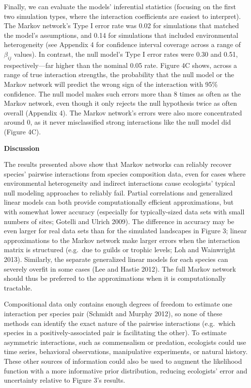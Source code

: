 \documentclass[12pt,]{article}
\begin{document}
\begin{spacing}{1.9}
\begin{flushleft}
Finally, we can evaluate the models' inferential statistics (focusing on
the first two simulation types, where the interaction coefficients are
easiest to interpret). The Markov network's Type I error rate was 0.02
for simulations that matched the model's assumptions, and 0.14 for
simulations that included environmental heterogeneity (see Appendix 4
for confidence interval coverage across a range of \(\beta_{ij}\)
values). In contrast, the null model's Type I error rates were 0.30 and
0.51, respectively---far higher than the nominal 0.05 rate. Figure 4C
shows, across a range of true interaction strengths, the probability
that the null model or the Markov network will predict the wrong sign of
the interaction with 95\% confidence. The null model makes such errors
more than 8 times as often as the Markov network, even though it only
rejects the null hypothesis twice as often overall (Appendix 4). The
Markov network's errors were also more concentrated around 0, as it
never misclassified strong interactions like the null model did (Figure
4C).

\noindent
\textbf{Discussion}

\noindent
The results presented above show that Markov networks can reliably
recover species' pairwise interactions from species composition data,
even for cases where environmental heterogeneity and indirect
interactions cause ecologists' typical null modeling approaches to
reliably fail. Partial correlations and generalized linear models can
both provide computationally efficient approximations, but with somewhat
lower accuracy (especially for typically-sized data sets with small
numbers of sites; Gotelli and Ulrich 2009). The difference in accuracy
may be even larger for real data sets than for the simulated landscapes
in Figure 3; linear approximations to the Markov network make larger
errors when the interaction matrix is structured (e.g.~due to guilds or
trophic levels; Loh and Wainwright 2013). Similarly, the separate
generalized linear models for each species can severely overfit in some
cases (Lee and Hastie 2012). The full Markov network should thus be
preferred to the approximations when it is computationally tractable.

Compositional data only contains enough degrees of freedom to estimate
one interaction per species pair (Schmidt and Murphy 2012), so none of
these methods can identify the exact nature of the pairwise interactions
(e.g.~which species in a positively-associated pair is facilitating the
other). To estimate asymmetric interactions, such as commensalism or
predation, ecologists could use time series, behavioral observations,
manipulative experiments, or natural history. These other sources of
information could also be used to augment the likelihood function with a
more informative prior distribution, reducing ecologists' error and
uncertainty relative to Figure 3's results.


\end{flushleft}
\end{spacing}
\end{document}
